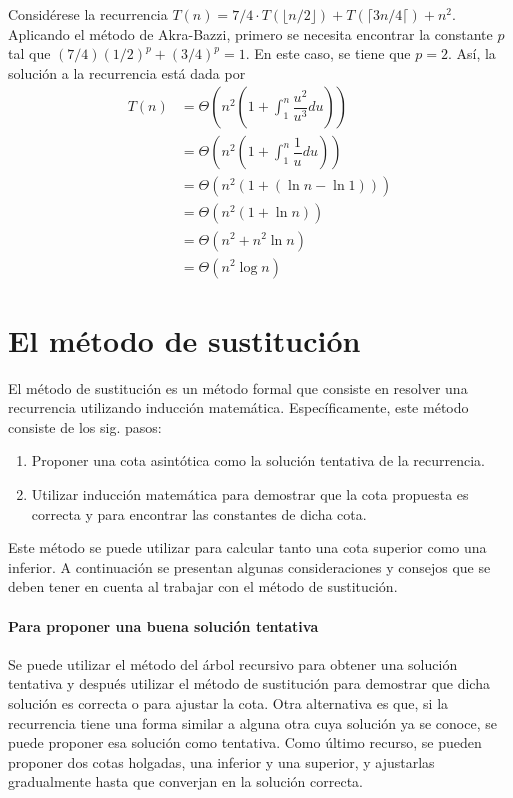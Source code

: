 \begin{expl}
    Considérese la recurrencia $T(n)=7/4\cdot T(\lfloor n/2 \rfloor)+T(\lceil 3n/4 \lceil)+n^2$.
    Aplicando el método de Akra-Bazzi, primero se necesita encontrar la constante $p$ tal que $(7/4)(1/2)^p+(3/4)^p=1$. En este caso, se tiene que $p=2$. Así, la solución a la 
    recurrencia está dada por
    \begin{align*}
        T(n)&=\Theta\left( n^2 \left( 1 + \int_1^n \dfrac{u^2}{u^3}du \right) \right) \\
        &= \Theta\left( n^2 \left( 1 + \int_1^n \dfrac{1}{u}du \right) \right) \\
        &= \Theta\left( n^2 \left( 1 + (\ln{n} - \ln{1}) \right) \right) \\
        &= \Theta\left( n^2 \left( 1 + \ln{n} \right) \right) \\
        &= \Theta(n^2 + n^2\ln{n}) \\
        &= \Theta(n^2\log{n})
    \end{align*}
    \exend
\end{expl}

\section{El método de sustitución}

El método de sustitución es un método formal que consiste en resolver
una recurrencia utilizando inducción matemática. Específicamente, este método
consiste de los sig. pasos:
\begin{enumerate}
    \item Proponer una cota asintótica como la solución tentativa
    de la recurrencia.
    \item Utilizar inducción matemática para demostrar que la cota propuesta
    es correcta y para encontrar las constantes de dicha cota.
\end{enumerate}

Este método se puede utilizar para calcular tanto una cota superior
como una inferior. A continuación se presentan algunas consideraciones
y consejos que se deben tener en cuenta al trabajar con el método de sustitución.

\paragraph{Para proponer una buena solución tentativa}
    Se puede utilizar el método del árbol recursivo para obtener una solución
    tentativa y después utilizar el método de sustitución para demostrar
    que dicha solución es correcta o para ajustar la cota.
    Otra alternativa es que, si la recurrencia tiene una forma similar a alguna otra 
    cuya solución ya se conoce, se puede proponer esa solución como tentativa.
    Como último recurso, se pueden proponer dos cotas holgadas, una inferior y 
    una superior, y ajustarlas gradualmente hasta que converjan en la solución correcta. 
